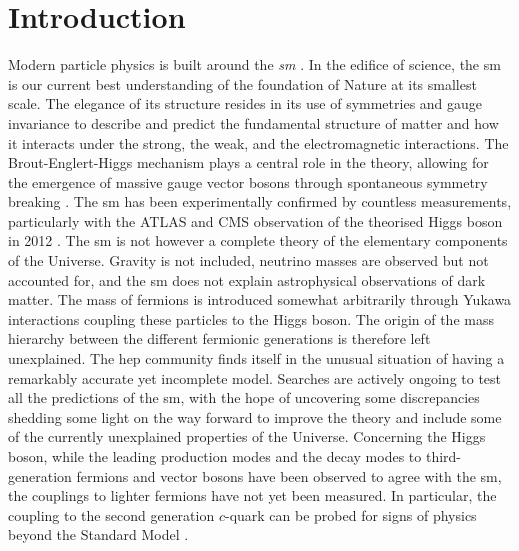 \chapter{\color{oxfordblue} Introduction}
\ChapFrame

Modern particle physics is built around the \textit{\gls{sm}} \cite{Schwartz_2013, SMphysics}. In the edifice of science, the \gls{sm} is our current best understanding of the foundation of Nature at its smallest scale. The elegance of its structure resides in its use of symmetries and gauge invariance to describe and predict the fundamental structure of matter and how it interacts under the strong, the weak, and the electromagnetic interactions. The Brout-Englert-Higgs mechanism plays a central role in the theory, allowing for the emergence of massive gauge vector bosons through spontaneous symmetry breaking \cite{Englert:1964et,  PhysRevLett.13.508}. The \gls{sm} has been experimentally confirmed by countless measurements, particularly with the ATLAS and CMS observation of the theorised Higgs boson in 2012 \cite{ATLAS:2012yve, CMS:2012qbp}. The \gls{sm} is not however a complete theory of the elementary components of the Universe. Gravity is not included, neutrino masses are observed but not accounted for, and the \gls{sm} does not explain astrophysical observations of dark matter. The mass of fermions is introduced somewhat arbitrarily through Yukawa interactions coupling these particles to the Higgs boson. The origin of the mass hierarchy between the different fermionic generations is therefore left unexplained. The \gls{hep} community finds itself in the unusual situation of having a remarkably accurate yet incomplete model. Searches are actively ongoing to test all the predictions of the \gls{sm}, with the hope of uncovering some discrepancies shedding some light on the way forward to improve the theory and include some of the currently unexplained properties of the Universe. Concerning the Higgs boson, while the leading production modes and the decay modes to third-generation fermions and vector bosons have been observed to agree with the \gls{sm}, the couplings to lighter fermions have not yet been measured. In particular, the coupling to the second generation $c$-quark can be probed for signs of physics beyond the Standard Model \cite{PhysRevD.89.033014,PhysRevD.92.033016,Botella:2016krk,PhysRevD.98.055001,GHOSH2016504,PhysRevLett.123.031802,PhysRevD.100.115041}. \\

